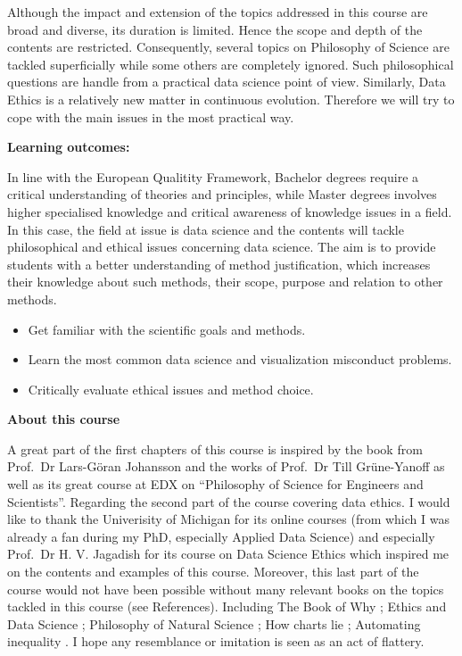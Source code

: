 \documentclass[
]{book}
\providecommand{\tightlist}{%
  \setlength{\itemsep}{0pt}\setlength{\parskip}{0pt}}
\begin{document}
Although the impact and extension of the topics addressed in this course are broad and diverse, its duration is limited. Hence the scope and depth of the contents are restricted. Consequently, several topics on Philosophy of Science are tackled superficially while some others are completely ignored. Such philosophical questions are handle from a practical data science point of view. Similarly, Data Ethics is a relatively new matter in continuous evolution. Therefore we will try to cope with the main issues in the most practical way.

\textbf{Learning outcomes:}

In line with the European Qualitity Framework, Bachelor degrees require a critical understanding of theories and principles, while Master degrees involves higher specialised knowledge and critical awareness of knowledge issues in a field. In this case, the field at issue is data science and the contents will tackle philosophical and ethical issues concerning data science. The aim is to provide students with a better understanding of method justification, which increases their knowledge about such methods, their scope, purpose and relation to other methods.

\begin{itemize}
\tightlist
\item
  Get familiar with the scientific goals and methods.
\item
  Learn the most common data science and visualization misconduct problems.
\item
  Critically evaluate ethical issues and method choice.
\end{itemize}

\textbf{About this course}

A great part of the first chapters of this course is inspired by the book from Prof.~Dr Lars-Göran Johansson \citep{johansson2016philosophy} and the works of Prof.~Dr Till Grüne-Yanoff \citep{grune2014teaching} as well as its great course at EDX on ``Philosophy of Science for Engineers and Scientists''. Regarding the second part of the course covering data ethics. I would like to thank the Univerisity of Michigan for its online courses (from which I was already a fan during my PhD, especially Applied Data Science) and especially Prof.~Dr H. V. Jagadish for its course on Data Science Ethics which inspired me on the contents and examples of this course. Moreover, this last part of the course would not have been possible without many relevant books on the topics tackled in this course (see References). Including The Book of Why \citep{book-of-why}; Ethics and Data Science \citep{loukides2018ethics}; Philosophy of Natural Science \citep{hempel-pos}; How charts lie \citep{cairo2019charts}; Automating inequality \citep{eubanks2018automating}. I hope any resemblance or imitation is seen as an act of flattery.
\end{document}
